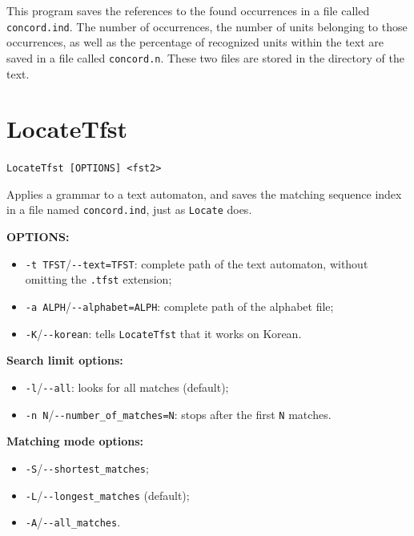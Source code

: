 \bigskip
\noindent {}This 
program saves the references to the found occurrences in a file called
\verb+concord.ind+. The number of occurrences, the number of units belonging to
those occurrences, as well as the percentage of recognized units within the text
are saved in a file called \verb+concord.n+. These two files are stored in the
directory of the text.







\section{LocateTfst}
\label{section-LocateTfst}
\verb+LocateTfst [OPTIONS] <fst2>+

\bigskip
\noindent {}
Applies a grammar to a text automaton, and saves the matching sequence index in a
file named \verb+concord.ind+, just as \verb+Locate+ does.

\bigskip
\noindent \textbf{OPTIONS:}
\begin{itemize}
  \item \verb+-t TFST+/\verb+--text=TFST+: complete path of the text automaton,
  without omitting the \verb+.tfst+ extension;

  \item \verb+-a ALPH+/\verb+--alphabet=ALPH+: complete path of the alphabet
  file;
  
  \item \verb+-K+/\verb+--korean+: tells \verb+LocateTfst+ that it works on
  Korean.
  
\end{itemize}

\bigskip
\noindent \textbf{Search limit options:}
\begin{itemize}
  \item \verb+-l+/\verb+--all+: looks for all matches (default);
  \item \verb+-n N+/\verb+--number_of_matches=N+: stops after the first
  \verb+N+ matches.
\end{itemize}

\bigskip
\noindent \textbf{Matching mode options:}
\begin{itemize}
  \item \verb+-S+/\verb+--shortest_matches+;
  \item \verb+-L+/\verb+--longest_matches+ (default);
  \item \verb+-A+/\verb+--all_matches+.
\end{itemize}

